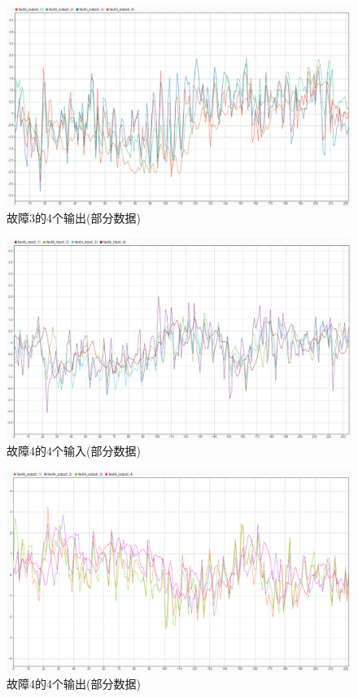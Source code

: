 \documentclass[lang=cn,11pt,a4paper]{elegantpaper}
\begin{document}
\begin{figure}[H] %
	\centering %
	\includegraphics[width=1.0\textwidth]{fault3_output} %
	\caption{故障3的4个输出(部分数据)} %
	\label{Fig.main2} %
\end{figure}
\begin{figure}[H] %
	\centering %
	\includegraphics[width=1.0\textwidth]{fault4_input} %
	\caption{故障4的4个输入(部分数据)} %
	\label{Fig.main2} %
\end{figure}
\begin{figure}[H] %
	\centering %
	\includegraphics[width=1.0\textwidth]{fault4_output} %
	\caption{故障4的4个输出(部分数据)} %
	\label{Fig.main2} %
\end{figure}
\end{document}
